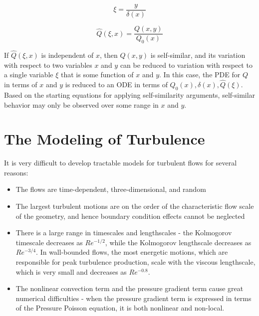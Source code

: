 \documentclass[10pt]{article}
\newcommand{\beq}{\begin{equation}}
\newcommand{\eeq}{\end{equation}}
\begin{document}
\begin{flushleft}
\beq
\xi=\frac{y}{\delta(x)}
\eeq

\beq
\hat{Q}(\xi,x)=\frac{Q(x,y)}{Q_0(x)}
\eeq

If \(\hat{Q}(\xi,x)\) is independent of \(x\), then \(Q(x,y)\) is self-similar, and its variation with respect to two variables \(x\) and \(y\) can be reduced to variation with respect to a single variable \(\xi\) that is some function of \(x\) and \(y\). In this case, the PDE for \(Q\) in terms of \(x\) and \(y\) is reduced to an ODE in terms of \(Q_0(x), \delta(x), \hat{Q}(\xi)\). Based on the starting equations for applying self-similarity arguments, self-similar behavior may only be observed over some range in \(x\) and \(y\). 



\section{The Modeling of Turbulence}

It is very difficult to develop tractable models for turbulent flows for several reasons:

\begin{itemize}
\item The flows are time-dependent, three-dimensional, and random
\item The largest turbulent motions are on the order of the characteristic flow scale of the geometry, and hence boundary condition effects cannot be neglected
\item There is a large range in timescales and lengthscales - the Kolmogorov timescale decreases as \(Re^{-1/2}\), while the Kolmogorov lengthscale decreases as \(Re^{-3/4}\). In wall-bounded flows, the most energetic motions, which are responsible for peak turbulence production, scale with the viscous lengthscale, which is very small and decreases as \(Re^{-0.8}\). 
\item The nonlinear convection term and the pressure gradient term cause great numerical difficulties - when the pressure gradient term is expressed in terms of the Pressure Poisson equation, it is both nonlinear and non-local. 
\end{itemize}


\end{flushleft}
\end{document}
